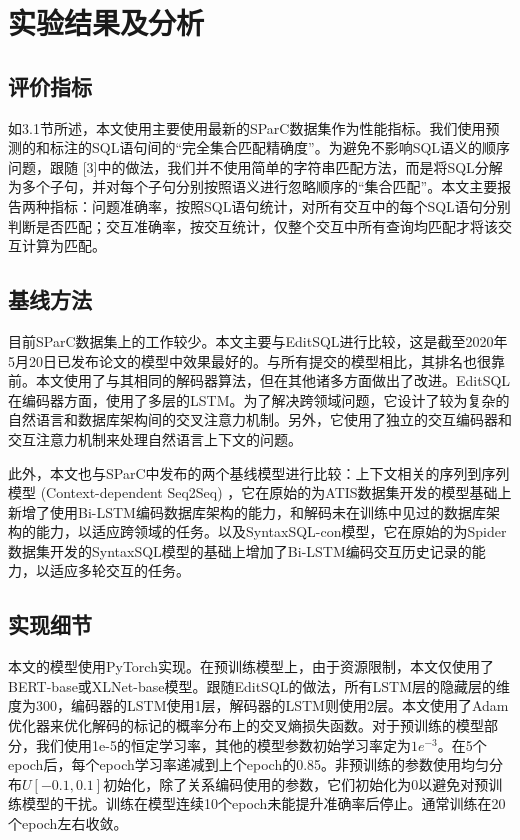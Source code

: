 \chapter{实验结果及分析}

\section{评价指标}

如3.1节所述，本文使用主要使用最新的SParC数据集作为性能指标。我们使用预测的和标注的SQL语句间的“完全集合匹配精确度”。为避免不影响SQL语义的顺序问题，跟随 [3]中的做法，我们并不使用简单的字符串匹配方法，而是将SQL分解为多个子句，并对每个子句分别按照语义进行忽略顺序的“集合匹配”。本文主要报告两种指标：问题准确率，按照SQL语句统计，对所有交互中的每个SQL语句分别判断是否匹配；交互准确率，按交互统计，仅整个交互中所有查询均匹配才将该交互计算为匹配。

\section{基线方法}

目前SParC数据集上的工作较少。本文主要与EditSQL进行比较，这是截至2020年5月20日已发布论文的模型中效果最好的。与所有提交的模型相比，其排名也很靠前。本文使用了与其相同的解码器算法，但在其他诸多方面做出了改进。EditSQL在编码器方面，使用了多层的LSTM。为了解决跨领域问题，它设计了较为复杂的自然语言和数据库架构间的交叉注意力机制。另外，它使用了独立的交互编码器和交互注意力机制来处理自然语言上下文的问题。

此外，本文也与SParC\cite{sparc19}中发布的两个基线模型进行比较：上下文相关的序列到序列模型 (Context-dependent Seq2Seq) ，它在原始的为ATIS数据集开发的模型基础上新增了使用Bi-LSTM编码数据库架构的能力，和解码未在训练中见过的数据库架构的能力，以适应跨领域的任务。以及SyntaxSQL-con模型，它在原始的为Spider数据集开发的SyntaxSQL\cite{yu-etal-2018-syntaxsqlnet}模型的基础上增加了Bi-LSTM编码交互历史记录的能力，以适应多轮交互的任务。

\section{实现细节}

本文的模型使用PyTorch\cite{pytorch19}实现。在预训练模型上，由于资源限制，本文仅使用了BERT-base或XLNet-base模型。跟随EditSQL的做法，所有LSTM层的隐藏层的维度为300，编码器的LSTM使用1层，解码器的LSTM则使用2层。本文使用了Adam\cite{Adam14}优化器来优化解码的标记的概率分布上的交叉熵损失函数。对于预训练的模型部分，我们使用1e-5的恒定学习率，其他的模型参数初始学习率定为$1e^{-3}$。在5个epoch后，每个epoch学习率递减到上个epoch的0.85。非预训练的参数使用均匀分布$U\left[-0.1,0.1\right]$初始化，除了关系编码使用的参数，它们初始化为0以避免对预训练模型的干扰。训练在模型连续10个epoch未能提升准确率后停止。通常训练在20个epoch左右收敛。

